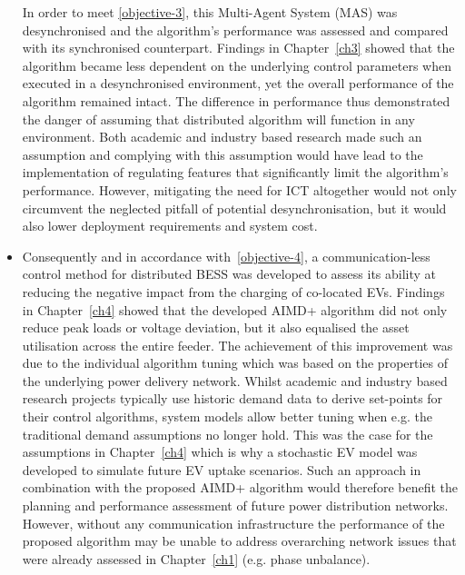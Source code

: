 \begin{itemize}
	In order to meet \ref{objective-3}, this Multi-Agent System (MAS) was desynchronised and the algorithm's performance was assessed and compared with its synchronised counterpart.
	Findings in Chapter~\ref{ch3} showed that the algorithm became less dependent on the underlying control parameters when executed in a desynchronised environment, yet the overall performance of the algorithm remained intact.
	The difference in performance thus demonstrated the danger of assuming that distributed algorithm will function in any environment.
	Both academic and industry based research made such an assumption and complying with this assumption would have lead to the implementation of regulating features that significantly limit the algorithm's performance.
	However, mitigating the need for ICT altogether would not only circumvent the neglected pitfall of  potential desynchronisation, but it would also lower deployment requirements and system cost.
	\item
	Consequently and in accordance with \ref{objective-4}, a communication-less control method for distributed BESS was developed to assess its ability at reducing the negative impact from the charging of co-located EVs.
	Findings in Chapter~\ref{ch4} showed that the developed AIMD+ algorithm did not only reduce peak loads or voltage deviation, but it also equalised the asset utilisation across the entire feeder.
	The achievement of this improvement was due to the individual algorithm tuning which was based on the properties of the underlying power delivery network.
	Whilst academic and industry based research projects typically use historic demand data to derive set-points for their control algorithms, system models allow better tuning when e.g. the traditional demand assumptions no longer hold.
	This was the case for the assumptions in Chapter~\ref{ch4} which is why a stochastic EV model was developed to simulate future EV uptake scenarios.
	Such an approach in combination with the proposed AIMD+ algorithm would therefore benefit the planning and performance assessment of future power distribution networks.
	However, without any communication infrastructure the performance of the proposed algorithm may be unable to address overarching network issues that were already assessed in Chapter~\ref{ch1} (e.g. phase unbalance).
\end{itemize}







